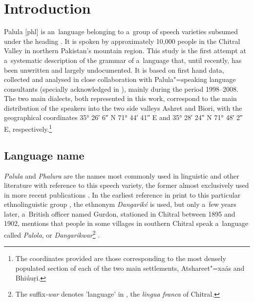 \chapter{Introduction}
\label{chap:1}

Palula [phl] is an~\iliIndoAryan language belonging to a~group of speech varieties subsumed under the heading
\iliShina. It is spoken by approximately 10,000 people in the Chitral Valley in northern Pakistan's
mountain region. This study is the first attempt at a~systematic description of the grammar of
a~language that, until recently, has been unwritten and largely undocumented. It is based on first
hand data, collected and analysed in close collaboration with Palula"=speaking language consultants
(specially acknowledged in ), mainly during the period 1998--2008. The two main
dialects, both represented in this work, correspond to the main distribution of the speakers into
the two side valleys Ashret and Biori, with the geographical coordinates 35° 26′ 6″ N 71° 44′ 41″ E and 35° 28′ 24″ N 71° 48′ 2″ E, respectively.\footnote{The coordinates provided are those corresponding to the most densely populated section of each of the two main settlements, Atshareet"=xaás and Bhiúuṛi.}

\section{Language name}
\label{sec:1-1}

\textit{Palula} and \textit{Phalura} are the names most commonly used in linguistic and other
literature with reference to this speech variety, the former almost exclusively used in more recent
publications \citep{cacopardo2001,bashir2003,heegardpetersen2006,schmidtkohistani2008,perder2013,baart2014}. In the earliest reference in print to this particular ethnolinguistic group
\citep[64]{biddulph1986}, the ethnonym \textit{Dangariké} is used, but only a~few years later,
a~British officer named Gurdon, stationed in Chitral between 1895 and 1902, mentions that people in
some villages in southern Chitral speak a~language called \textit{Palola}, or
\textit{Dangarikwar}\footnote{The  suffix\textit{-war} denotes 'language' in \iliKhowar, the
  \textit{lingua franca} of Chitral.} \citep{morgenstierne1941}.


